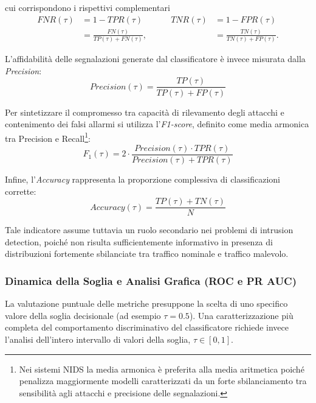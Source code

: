 cui corrispondono i rispettivi complementari
\begin{equation}
\begin{aligned}
    FNR(\tau) &= 1-TPR(\tau) \\
              &= \frac{FN(\tau)}{TP(\tau)+FN(\tau)},
\end{aligned}
\qquad
\begin{aligned}
    TNR(\tau) &= 1-FPR(\tau) \\
              &= \frac{TN(\tau)}{TN(\tau)+FP(\tau)}.
\end{aligned}
\end{equation}

L'affidabilità delle segnalazioni generate dal classificatore è invece misurata dalla \textit{Precision}:
\begin{equation}
    Precision(\tau)=\frac{TP(\tau)}{TP(\tau)+FP(\tau)}
\end{equation}

Per sintetizzare il compromesso tra capacità di rilevamento degli attacchi e contenimento dei falsi allarmi si utilizza l'\textit{F1-score}, definito come media armonica tra Precision e Recall\footnote{Nei sistemi NIDS la media armonica è preferita alla media aritmetica poiché penalizza maggiormente modelli caratterizzati da un forte sbilanciamento tra sensibilità agli attacchi e precisione delle segnalazioni.}:
\begin{equation}
    F_1(\tau)=2\cdot\frac{Precision(\tau)\cdot TPR(\tau)}{Precision(\tau)+TPR(\tau)}
\end{equation}

Infine, l'\textit{Accuracy} rappresenta la proporzione complessiva di classificazioni corrette:
\begin{equation}
    Accuracy(\tau)=\frac{TP(\tau)+TN(\tau)}{N}
\end{equation}

Tale indicatore assume tuttavia un ruolo secondario nei problemi di intrusion detection, poiché non risulta sufficientemente informativo in presenza di distribuzioni fortemente sbilanciate tra traffico nominale e traffico malevolo.

\subsubsection{Dinamica della Soglia e Analisi Grafica (ROC e PR AUC)}
\label{subsubsec:analisi_grafica}

La valutazione puntuale delle metriche presuppone la scelta di uno specifico valore della soglia decisionale (ad esempio $\tau=0.5$). Una caratterizzazione più completa del comportamento discriminativo del classificatore richiede invece l'analisi dell'intero intervallo di valori della soglia, $\tau\in[0,1]$.

